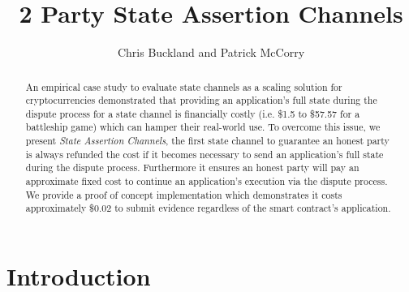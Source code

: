 \documentclass{llncs}
\begin{document}
	\title{2 Party State Assertion Channels } 
	
	\author{Chris Buckland and Patrick McCorry}
	
	
	
	\maketitle
	\begin{abstract}
	An empirical case study to evaluate state channels as a scaling solution for cryptocurrencies demonstrated that providing an application's full state during the dispute process for a state channel is financially costly (i.e. \$1.5 to \$57.57 for a battleship game) which can hamper their real-world use. 
	To overcome this issue, we present \emph{State Assertion Channels}, the first state channel to guarantee  an honest party is always refunded the cost if it becomes necessary to send an application's full state during the dispute process. 
	Furthermore it ensures an honest party will pay an approximate fixed cost to continue an application's execution via the dispute process. 
	We provide a proof of concept implementation which demonstrates it costs approximately \$0.02 to submit evidence  regardless of the smart contract's application. 

	\end{abstract} 

\section{Introduction}
\end{document}
